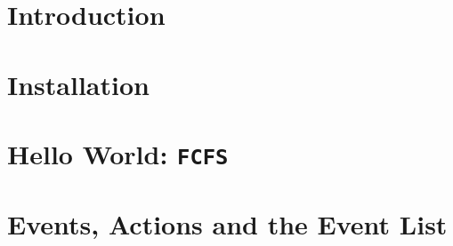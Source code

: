 \documentclass[12pt]{book}
\begin{document}
\chapter{Introduction}
\label{chap:intro}


\chapter{Installation}
\label{chap:install}


\chapter{Hello World: \texttt{FCFS}}
\label{chap:hello-world}


\chapter{Events, Actions and the Event List}
\label{chap:events-actions-event-list}


%

%

%

%

%

%
\end{document}
